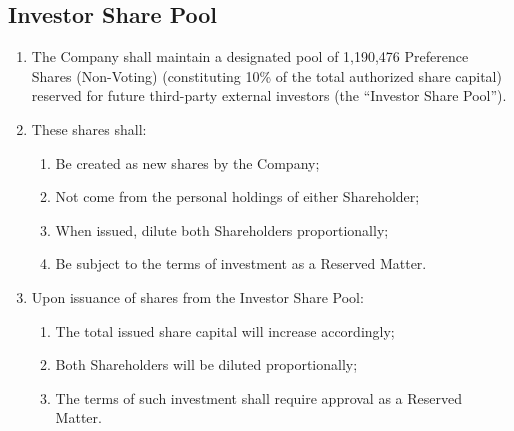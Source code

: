 \subsection{Investor Share Pool}
\begin{enumerate}[label=(\alph*)]
\item The Company shall maintain a designated pool of 1,190,476 Preference Shares (Non-Voting) (constituting 10\% of the total authorized share capital) reserved for future third-party external investors (the ``Investor Share Pool'').
\item These shares shall:
    \begin{enumerate}[label=(\roman*)]
    \item Be created as new shares by the Company;
    \item Not come from the personal holdings of either Shareholder;
    \item When issued, dilute both Shareholders proportionally;
    \item Be subject to the terms of investment as a Reserved Matter.
    \end{enumerate}
\item Upon issuance of shares from the Investor Share Pool:
    \begin{enumerate}[label=(\roman*)]
    \item The total issued share capital will increase accordingly;
    \item Both Shareholders will be diluted proportionally;
    \item The terms of such investment shall require approval as a Reserved Matter.
    \end{enumerate}
\end{enumerate}

